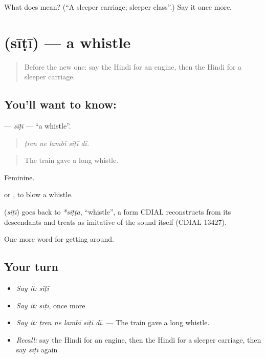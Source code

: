 \begin{tcolorbox}[breakable,colback=teal!4,colframe=teal!35!black,title={Before you move on}]
What does  mean? (\textquotedblleft{}A sleeper carriage; sleeper class\textquotedblright{}.) Say it once more.
\end{tcolorbox}
\section[\texorpdfstring{\hi{सीटी} (sīṭī)}{सीटी (sīṭī)}]{ (sīṭī) — a whistle}

\label{lesson:HI-C399-siti}



\begin{quote}
Before the new one: say the Hindi for an engine, then the Hindi for a sleeper carriage.
\end{quote}

\subsection*{You'll want to know: }
\textbf{} — \emph{sīṭī} — \textquotedblleft{}a whistle\textquotedblright{}.

\begin{quote}
    
\end{quote}

\begin{quote}
\emph{ṭren ne lambī sīṭī dī.}
\end{quote}

\begin{quote}
The train gave a long whistle.
\end{quote}

Feminine.

  or  , to blow a whistle.

\begin{cousinweb}
\textbf{} (\emph{sīṭī}) goes back to \emph{*sīṭṭa}, \textquotedblleft{}whistle\textquotedblright{}, a form CDIAL reconstructs from its descendants and treats as imitative of the sound itself (CDIAL 13427).
\end{cousinweb}

\begin{grammarlens}[title={What you've built}]
One more word for getting around.
\end{grammarlens}

\subsection*{Your turn}
\begin{itemize}
\raggedright
  \item \emph{Say it:} \emph{sīṭī}
  \item \emph{Say it:} \emph{sīṭī}, once more
  \item \emph{Say it:} \emph{ṭren ne lambī sīṭī dī.} — The train gave a long whistle.
  \item \emph{Recall:} say the Hindi for an engine, then the Hindi for a sleeper carriage, then say \emph{sīṭī} again
\end{itemize}

